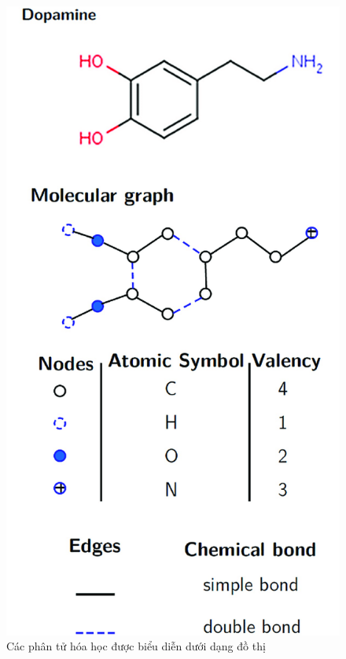 \begin{figure}[H]
    \begin{center}
        \includegraphics[scale=0.3]{images/chemistry-molecule}
        \caption{Các phân tử hóa học được biểu diễn dưới dạng đồ thị}
        \label{fig:chemistry-molecule}
    \end{center}
\end{figure}

